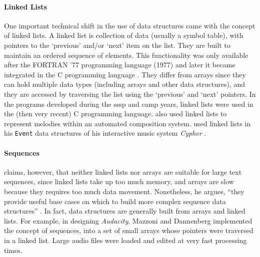 \paragraph{Linked Lists}
\label{computer:linked}
One important technical shift in the use of data structures came with the concept of linked lists. A linked list is collection of data (usually a symbol table), with pointers to the `previous' and/or `next' item on the list. They are built to maintain an ordered sequence of elements. This functionality was only available after the FORTRAN '77 programming language (1977) and later it became integrated in the C programming language \parencite{kernighan_c_1978}. They differ from arrays since they can hold multiple data types (including arrays and other data structures), and they are accessed by traversing the list using the `previous' and `next' pointers. In the programs developed during the \gls{sssp} and \gls{camp} years, linked lists were used in the (then very recent) C programming language. \citeauthor{icmc/bbp2372.1985.040} \parencite{icmc/bbp2372.1985.040} also used linked lists to represent melodies within an automated composition system. \citeauthor{Row92:Int} used linked lists in his \texttt{Event} data structures of his interactive music system \textit{Cypher}  \parencite{Row92:Int}.

\paragraph{Sequences}
\label{computer:audacity}
\citeauthor{crowley98} claims, however, that neither linked lists nor arrays are suitable for large text sequences, since linked lists take up too much memory, and arrays are slow because they requires too much data movement. Nonetheless, he argues, ``they provide useful base cases on which to build more complex sequence data structures'' \parencite{crowley98}. In fact, data structures are generally built from arrays and linked lists. For example, in designing \textit{Audacity}, Mazzoni and Dannenberg \parencite{icmc/bbp2372.2001.051} implemented the concept of sequences, into a set of small arrays whose pointers were traversed in a linked list. Large audio files were loaded and edited at very fast processing times.
